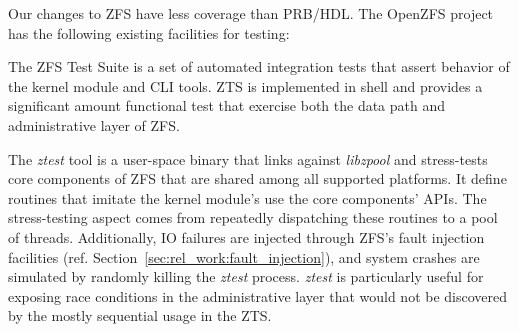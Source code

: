 \documentclass[12pt,a4paper,twoside]{book}
\begin{document}
Our changes to ZFS have less coverage than PRB/HDL.
The OpenZFS project has the following existing facilities for testing:
\begin{description}[noitemsep]
    \item[ZFS Test Suite (ZTS)] The ZFS Test Suite is a set of automated integration tests that assert behavior of the kernel module and CLI tools.
        ZTS is implemented in shell and provides a significant amount functional test that exercise both the data path and administrative layer of ZFS.
    \item[ztest] The \textit{ztest} tool is a user-space binary that links against \textit{libzpool} and stress-tests core components of ZFS that are shared among all supported platforms.
        It define routines that imitate the kernel module's use the core components' APIs.
        The stress-testing aspect comes from repeatedly dispatching these routines to a pool of threads.
        Additionally, IO failures are injected through ZFS's fault injection facilities (ref. Section~\ref{sec:rel_work:fault_injection}), and system crashes are simulated by randomly killing the \textit{ztest} process.
        \textit{ztest} is particularly useful for exposing race conditions in the administrative layer that would not be discovered by the mostly sequential usage in the ZTS.
\end{description}
\end{document}
